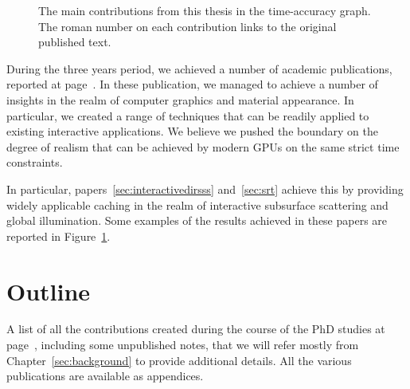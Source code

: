 \begin{figure}
\caption{The main contributions from this thesis in the time-accuracy graph. The roman number on each contribution links to the original published text.} 
\label{fig:main_results}
\end{figure}

During the three years period, we achieved a number of academic publications, reported at page~\pageref{sec:contributionlist}. In these publication, we managed to achieve a number of insights in the realm of computer graphics and material appearance. In particular, we created a range of techniques that can be readily applied to existing interactive applications. We believe we pushed the boundary on the degree of realism that can be achieved by modern GPUs on the same strict time constraints. 

In particular, papers~\ref{sec:interactivedirsss} and~\ref{sec:srt} achieve this by providing widely applicable caching in the realm of interactive subsurface scattering and global illumination. Some examples of the results achieved in these papers are reported in Figure~\ref{fig:main_results}.

\section{Outline}

A list of all the contributions created during the course of the PhD studies at page~\pageref{sec:contributionlist}, including some unpublished notes, that we will refer mostly from Chapter~\ref{sec:background} to provide additional details. All the various publications are available as appendices. 

